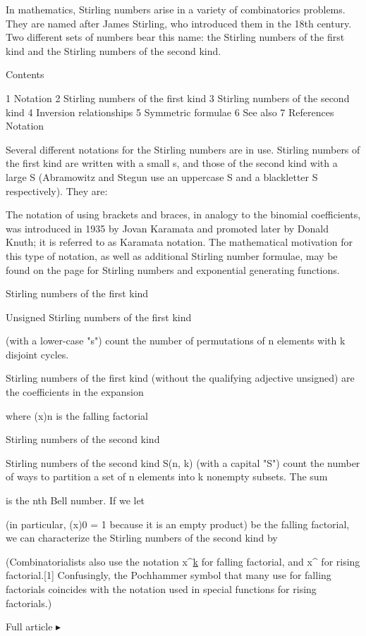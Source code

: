 In mathematics, Stirling numbers arise in a variety of combinatorics problems. They are named after James Stirling, who introduced them in the 18th century. Two different sets of numbers bear this name: the Stirling numbers of the first kind and the Stirling numbers of the second kind.

Contents

1 Notation
2 Stirling numbers of the first kind
3 Stirling numbers of the second kind
4 Inversion relationships
5 Symmetric formulae
6 See also
7 References
Notation

Several different notations for the Stirling numbers are in use. Stirling numbers of the first kind are written with a small s, and those of the second kind with a large S (Abramowitz and Stegun use an uppercase S and a blackletter S respectively). They are:

The notation of using brackets and braces, in analogy to the binomial coefficients, was introduced in 1935 by Jovan Karamata and promoted later by Donald Knuth; it is referred to as Karamata notation. The mathematical motivation for this type of notation, as well as additional Stirling number formulae, may be found on the page for Stirling numbers and exponential generating functions.

Stirling numbers of the first kind

Unsigned Stirling numbers of the first kind

(with a lower-case "s") count the number of permutations of n elements with k disjoint cycles.

Stirling numbers of the first kind (without the qualifying adjective unsigned) are the coefficients in the expansion

where (x)n is the falling factorial

Stirling numbers of the second kind

Stirling numbers of the second kind S(n, k) (with a capital "S") count the number of ways to partition a set of n elements into k nonempty subsets. The sum

is the nth Bell number. If we let

(in particular, (x)0 = 1 because it is an empty product) be the falling factorial, we can characterize the Stirling numbers of the second kind by

(Combinatorialists also use the notation x^{\underline{k\!}} for falling factorial, and x^{} for rising factorial.[1] Confusingly, the Pochhammer symbol that many use for falling factorials coincides with the notation used in special functions for rising factorials.)

Full article ▸
